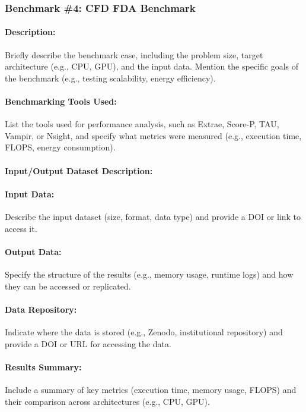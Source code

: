 \subsubsection{Benchmark \#4: CFD FDA Benchmark}

\paragraph{Description:} Briefly describe the benchmark case, including the problem size, target architecture (e.g., CPU, GPU), and the input data. Mention the specific goals of the benchmark (e.g., testing scalability, energy efficiency).

\paragraph{Benchmarking Tools Used:} List the tools used for performance analysis, such as Extrae, Score-P, TAU, Vampir, or Nsight, and specify what metrics were measured (e.g., execution time, FLOPS, energy consumption).

\paragraph{Input/Output Dataset Description:}
\paragraph{Input Data:} Describe the input dataset (size, format, data type) and provide a DOI or link to access it.

\paragraph{Output Data:} Specify the structure of the results (e.g., memory usage, runtime logs) and how they can be accessed or replicated.

\paragraph{Data Repository:} Indicate where the data is stored (e.g., Zenodo, institutional repository) and provide a DOI or URL for accessing the data.

\paragraph{Results Summary:} Include a summary of key metrics (execution time, memory usage, FLOPS) and their comparison across architectures (e.g., CPU, GPU).

